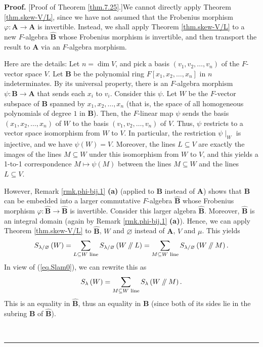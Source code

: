 \documentclass[numbers=enddot,12pt,final,onecolumn,notitlepage]{scrartcl}%
\numberwithin{exer}{section}
\theoremstyle{definition}
\newenvironment{proof}[1][Proof]{\noindent\textbf{#1.} }{\ \rule{0.5em}{0.5em}}
\let\sumnonlimits\sum
\renewcommand{\sum}{\sumnonlimits\limits}
\newcommand{\sslash}{\mathbin{/\mkern-5mu/}}
\theoremstyle{plainsl}
\begin{document}
\begin{proof}
[Proof of Theorem \ref{thm.7.25}.]We cannot directly apply Theorem
\ref{thm.skew-V/L}, since we have not assumed that the Frobenius morphism
$\varphi:\mathbf{A}\rightarrow\mathbf{A}$ is invertible. Instead, we shall
apply Theorem \ref{thm.skew-V/L} to a new $F$-algebra $\widehat{\mathbf{B}}$
whose Frobenius morphism is invertible, and then transport the result to
$\mathbf{A}$ via an $F$-algebra morphism.

Here are the details: Let $n=\dim V$, and pick a basis $\left(  v_{1}%
,v_{2},\ldots,v_{n}\right)  $ of the $F$-vector space $V$. Let $\mathbf{B}$ be
the polynomial ring $F\left[  x_{1},x_{2},\ldots,x_{n}\right]  $ in $n$
indeterminates. By its universal property, there is an $F$-algebra morphism
$\psi:\mathbf{B}\rightarrow\mathbf{A}$ that sends each $x_{i}$ to $v_{i}$.
Consider this $\psi$. Let $W$ be the $F$-vector subspace of $\mathbf{B}$
spanned by $x_{1},x_{2},\ldots,x_{n}$ (that is, the space of all homogeneous
polynomials of degree $1$ in $\mathbf{B}$). Then, the $F$-linear map $\psi$
sends the basis $\left(  x_{1},x_{2},\ldots,x_{n}\right)  $ of $W$ to the
basis $\left(  v_{1},v_{2},\ldots,v_{n}\right)  $ of $V$. Thus, $\psi$
restricts to a vector space isomorphism from $W$ to $V$. In particular, the
restriction $\psi\mid_{W}$ is injective, and we have $\psi\left(  W\right)
=V$. Moreover, the lines $L\subseteq V$ are exactly the images of the lines
$M\subseteq W$ under this isomorphism from $W$ to $V$, and this yields a
1-to-1 correspondence $M\mapsto\psi\left(  M\right)  $ between the lines
$M\subseteq W$ and the lines $L\subseteq V$.

However, Remark \ref{rmk.phi-bij.1} \textbf{(a)} (applied to $\mathbf{B}$
instead of $\mathbf{A}$) shows that $\mathbf{B}$ can be embedded into a larger
commutative $F$-algebra $\widehat{\mathbf{B}}$ whose Frobenius morphism
$\varphi:\widehat{\mathbf{B}}\rightarrow\widehat{\mathbf{B}}$ is invertible.
Consider this larger algebra $\widehat{\mathbf{B}}$. Moreover,
$\widehat{\mathbf{B}}$ is an integral domain (again by Remark
\ref{rmk.phi-bij.1} \textbf{(a)}). Hence, we can apply Theorem
\ref{thm.skew-V/L} to $\widehat{\mathbf{B}}$, $W$ and $\varnothing$ instead of
$\mathbf{A}$, $V$ and $\mu$. This yields
\[
S_{\lambda/\varnothing}\left(  W\right)  =\sum_{L\subseteq W\text{ line}%
}S_{\lambda/\varnothing}\left(  W\sslash L\right)  =\sum_{M\subseteq W\text{
line}}S_{\lambda/\varnothing}\left(  W\sslash M\right)  .
\]
In view of (\ref{eq.Slam0}), we can rewrite this as
\begin{equation}
S_{\lambda}\left(  W\right)  =\sum_{M\subseteq W\text{ line}}S_{\lambda
}\left(  W\sslash M\right)  . \label{pf.thm.7.25.4}%
\end{equation}
This is an equality in $\widehat{\mathbf{B}}$, thus an equality in
$\mathbf{B}$ (since both of its sides lie in the subring $\mathbf{B}$ of
$\widehat{\mathbf{B}}$).


\end{proof}
\end{document}
